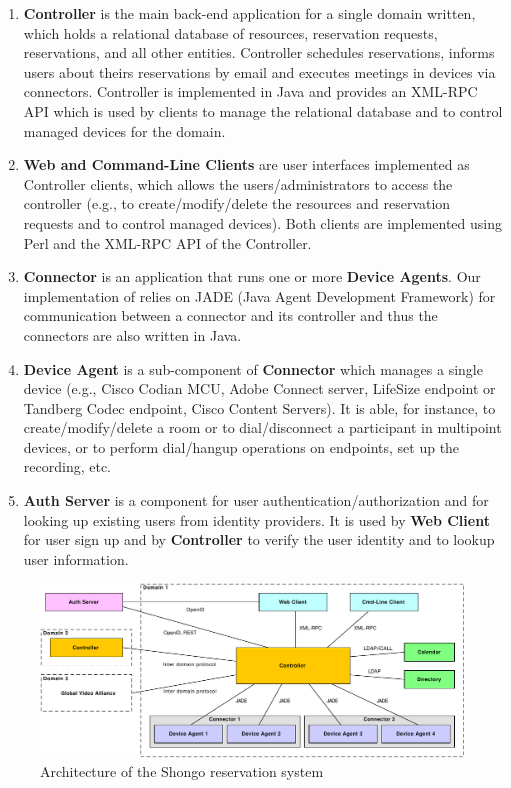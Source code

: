 \begin{enumerate}

\item \textbf{Controller} is the main back-end application for a single domain written, which holds a relational database of resources, reservation requests, reservations, and all other entities.  Controller schedules reservations, informs users about theirs reservations by email and executes meetings in devices via connectors. Controller is implemented in Java and provides an XML-RPC API which is used by clients to manage the relational database and to control managed devices for the domain.

\item \textbf{Web and Command-Line Clients} are user interfaces implemented as Controller clients, which allows the users/administrators to access the controller (e.g., to create/modify/delete the resources and reservation requests and to control managed devices). Both clients are implemented using Perl and the XML-RPC API of the Controller.

\item \textbf{Connector} is an application that runs one or more \textbf{Device Agents}. Our implementation of relies on JADE (Java Agent Development Framework) for communication between a connector and its controller and thus the connectors are also written in Java.

\item \textbf{Device Agent} is a sub-component of \textbf{Connector} which manages a single device (e.g., Cisco Codian MCU, Adobe Connect server, LifeSize endpoint or Tandberg Codec endpoint, Cisco Content Servers). It is able, for instance, to create/modify/delete a room or to dial/disconnect a participant in multipoint devices, or to perform dial/hangup operations on endpoints, set up the recording, etc.

\item \textbf{Auth Server} is a component for user authentication/authorization and for looking up existing users from identity providers. It is used by \textbf{Web Client} for user sign up and by \textbf{Controller} to verify the user identity and to lookup user information.

\end{enumerate}

\begin{figure}[ht!]
\includegraphics[width=\textwidth]{diagrams/dd_architecture}
\caption{Architecture of the Shongo reservation system}
\label{fig:architecture}
\end{figure}

